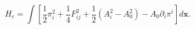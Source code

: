 \begin{equation}
  H_c=\int\left[\frac{1}{2}\pi_i ^2 + \frac{1}{4}F_{ij} ^2+\frac{1}{2}(A_i^2 - A_0 ^2)-A_0
  \partial_i \pi^i\right] d\textbf{x}.
  \label{a40}
  \end{equation}

